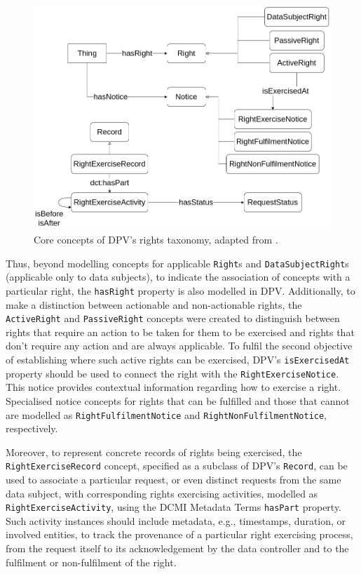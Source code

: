 \begin{figure}[ht]
    \centering
    \includegraphics[width=0.8\linewidth]{figures/chapter-4/DPV-rights.png}
    \caption[Core concepts of DPV's rights taxonomy.]{Core concepts of DPV's rights taxonomy, adapted from \cite{pandit_primer_2022}.}
    \label{fig:rights_dpv}
\end{figure}

Thus, beyond modelling concepts for applicable \texttt{Right}s and \texttt{DataSubjectRight}s (applicable only to data subjects), to indicate the association of concepts with a particular right, the \texttt{hasRight} property is also modelled in DPV.
Additionally, to make a distinction between actionable and non-actionable rights, the \texttt{ActiveRight} and \texttt{PassiveRight} concepts were created to distinguish between rights that require an action to be taken for them to be exercised and rights that don't require any action and are always applicable.%
To fulfil the second objective of establishing where such active rights can be exercised, DPV's \texttt{isExercisedAt} property should be used to connect the right with the \texttt{RightExerciseNotice}.
This notice provides contextual information regarding how to exercise a right.
Specialised notice concepts for rights that can be fulfilled and those that cannot are modelled as \texttt{RightFulfilmentNotice} and \texttt{RightNonFulfilmentNotice}, respectively.

Moreover, to represent concrete records of rights being exercised, the \texttt{RightExerciseRecord} concept, specified as a subclass of DPV's \texttt{Record}, can be used to associate a particular request, or even distinct requests from the same data subject, with corresponding rights exercising activities, modelled as \texttt{RightExerciseActivity}, using the DCMI Metadata Terms \texttt{hasPart} property.
Such activity instances should include metadata, e.g., timestamps, duration, or involved entities, to track the provenance of a particular right exercising process, from the request itself to its acknowledgement by the data controller and to the fulfilment or non-fulfilment of the right.

